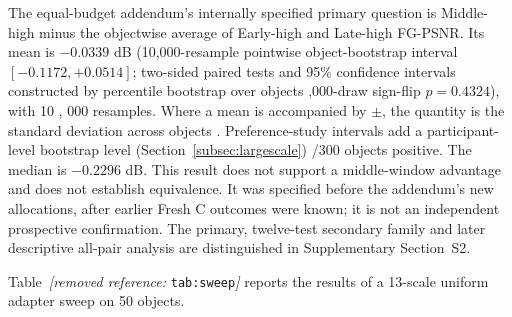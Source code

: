 \documentclass[times,twocolumn,final]{elsarticle}
\providecommand{\DIFadd}[1]{{\protect\color{blue} \sf #1}} %
\providecommand{\DIFdel}[1]{{\protect\color{red} \scriptsize #1}} %
\providecommand{\DIFaddbegin}{} %
\providecommand{\DIFaddend}{} %
\providecommand{\DIFdelbegin}{} %
\providecommand{\DIFdelend}{} %
\begin{document}
\DIFadd{The equal-budget addendum's internally specified primary question is Middle-high minus the objectwise average of Early-high and Late-high FG-PSNR. Its mean is $-0.0339$ dB (10,000-resample pointwise object-bootstrap interval $[-0.1172,+0.0514]$; }\DIFaddend two-sided \DIFdelbegin \DIFdel{paired tests and 95\% confidence intervals constructed by percentile bootstrap over objects}\DIFdelend \DIFaddbegin \DIFadd{20,000-draw sign-flip $p=0.4324$), }\DIFaddend with \DIFdelbegin \DIFdel{10}%
\DIFdel{, }%
\DIFdel{000 resamples. Where a mean is accompanied by $\pm$, the quantity is the standard deviation across objects . Preference-study intervals add a participant-level bootstrap level (Section~\ref{subsec:largescale})}\DIFdelend \DIFaddbegin \DIFadd{119/300 objects positive. The median is $-0.2296$ dB. This result does not support a middle-window advantage and does not establish equivalence. It was specified before the addendum's new allocations, after earlier Fresh C outcomes were known; it is not an independent prospective confirmation. The primary, twelve-test secondary family and later descriptive all-pair analysis are distinguished in Supplementary Section~S2}\DIFaddend .

\DIFdelbegin %

\DIFdel{Table~\textit{[removed reference: }\texttt{tab:sweep}\textit{]} reports the results of a 13-scale uniform adapter sweep on 50 objects. }%
\end{document}

